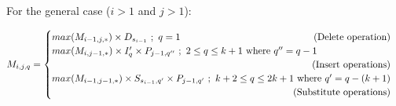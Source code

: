 \documentclass[11pt]{article}
\begin{document}
For the general case ($i>1$ and $j>1$):
		
$M_{i,j,q} = \begin{cases}
		{max}(M_{i-1,j,*}) \times D_{s_{i-1}} ~;~ q=1 \hfill\text{(Delete operation)}\\
		{max}(M_{i,j-1,*}) \times I_q' \times P_{j-1,q''} ~;~ 2\leq q\leq k+1 \text{ where } q''=q-1 \\\-\hfill\text{(Insert operations)}\\
		{max}(M_{i-1,j-1,*}) \times S_{s_{i-1},q'} \times P_{j-1,q'} ~;~ k+2\leq q\leq 2k+1 \text{ where } q'=q-(k+1) \\\-\hfill\text{(Substitute operations)}\\
		\end{cases}$ \\\-\hfill
\end{document}
